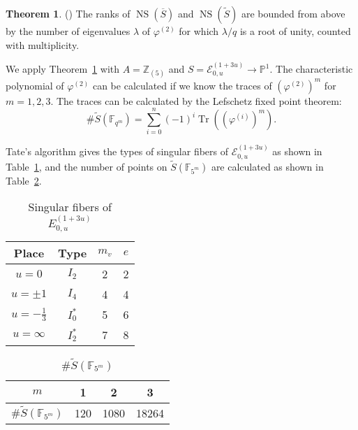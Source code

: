 \documentclass[a4paper]{jarticle} %
\theoremstyle{definition}
\newtheorem{thm}{Theorem}[section]
\theoremstyle{remark}
\DeclareMathOperator{\NS}{NS}
\DeclareMathOperator{\Tr}{Tr}
\begin{document}
\begin{thm}{(\cite[Corollary 6.4.]{ref:vanluijk2007})}
    \label{cor:ns_upper_bound}
    The ranks of $\NS (\overline{S})$ and $\NS (\tilde{S})$ are bounded from above by the number of eigenvalues $\lambda$ of $\varphi^{(2)}$ for which $\lambda/q$ is a root of unity, counted with multiplicity.
\end{thm}

We apply Theorem~\ref{cor:ns_upper_bound} with $A = \mathbb{Z}_{(5)}$ and $S = \mathcal{E}_{0,u}^{(1 + 3u)} \to \mathbb{P}^1$.
The characteristic polynomial of $\varphi^{(2)}$ can be calculated if we know the traces of $(\varphi^{(2)})^m$ for $m=1,2,3$.
The traces can be calculated by the Lefschetz fixed point theorem:
\begin{equation*}
    \# \tilde{S}(\mathbb{F}_{q^{m}}) = \sum_{i = 0}^{n} ( - 1)^{i} \Tr((\varphi^{(i)})^{m}).
\end{equation*}

Tate's algorithm gives the types of singular fibers of $\mathcal{E}_{0,u}^{(1 + 3u)}$ as shown in Table~\ref{tab:E_{0,u}^{(1 + 3u)}}, 
and the number of points on $\tilde{S}(\mathbb{F}_{5^{m}})$ are calculated as shown in Table~\ref{tab:tm}.

\begin{table}[ht]
    \centering
    \caption{Singular fibers of $E_{0,u}^{(1 + 3u)}$}
    \begin{tabular}{|c|c|c|c|}
        \hline
        Place            & Type    & $m_v$ & $e$ \\
        \hline
        $u=0$            & $I_2$   & 2     & 2   \\
        $u=\pm 1$        & $I_4$   & 4     & 4   \\
        $u=-\frac{1}{3}$ & $I_0^*$ & 5     & 6   \\
        $u=\infty$       & $I_2^*$ & 7     & 8   \\
        \hline
    \end{tabular}
    \label{tab:E_{0,u}^{(1 + 3u)}}
\end{table}

\begin{table}[ht]
    \centering
    \caption{$\# \tilde{S}(\mathbb{F}_{5^{m}})$}
    \begin{tabular}{|c|c|c|c|}
        \hline
        $m$                              & 1   & 2    & 3     \\
        \hline
        $\# \tilde{S}(\mathbb{F}_{5^m})$ & 120 & 1080 & 18264 \\
        \hline
    \end{tabular}
    \label{tab:tm}
\end{table}
\end{document}
